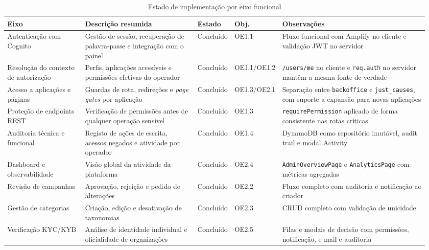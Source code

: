 \begin{table}[H]
\caption{Estado de implementação por eixo funcional}
\label{tab:avaliacao_rf}
\begin{center}
\begingroup
\scriptsize
\setlength{\tabcolsep}{4pt}
\begin{tabular}{|>{\raggedright\arraybackslash}p{2.3cm}|>{\raggedright\arraybackslash}p{3.2cm}|>{\raggedright\arraybackslash}p{1.2cm}|>{\raggedright\arraybackslash}p{1.8cm}|>{\raggedright\arraybackslash}p{3.7cm}|}
\hline
\textbf{Eixo} & \textbf{Descrição resumida} & \textbf{Estado} & \textbf{Obj.} & \textbf{Observações} \\ \hline
Autenticação com Cognito & Gestão de sessão, recuperação de palavra-passe e integração com o painel & Concluído & OE1.1 & Fluxo funcional com Amplify no cliente e validação JWT no servidor \\ \hline
Resolução do contexto de autorização & Perfis, aplicações acessíveis e permissões efetivas do operador & Concluído & OE1.1/OE1.2 & \texttt{/users/me} no cliente e \texttt{req.auth} no servidor mantêm a mesma fonte de verdade \\ \hline
Acesso a aplicações e páginas & Guardas de rota, redireções e \textit{page gates} por aplicação & Concluído & OE1.3/OE2.1 & Separação entre \texttt{backoffice} e \texttt{just\_causes}, com suporte a expansão para novas aplicações \\ \hline
Proteção de endpoints \gls{REST} & Verificação de permissões antes de qualquer operação sensível & Concluído & OE1.3 & \texttt{requirePermission} aplicado de forma consistente nas rotas críticas \\ \hline
Auditoria técnica e funcional & Registo de ações de escrita, acessos negados e atividade por operador & Concluído & OE1.4 & DynamoDB como repositório imutável, audit trail e modal Activity \\ \hline
Dashboard e observabilidade & Visão global da atividade da plataforma & Concluído & OE2.4 & \texttt{AdminOverviewPage} e \texttt{AnalyticsPage} com métricas agregadas \\ \hline
Revisão de campanhas & Aprovação, rejeição e pedido de alterações & Concluído & OE2.2 & Fluxo completo com auditoria e notificação ao criador \\ \hline
Gestão de categorias & Criação, edição e desativação de taxonomias & Concluído & OE2.3 & \gls{CRUD} completo com validação de unicidade \\ \hline
Verificação KYC/KYB & Análise de identidade individual e oficialidade de organizações & Concluído & OE2.5 & Filas e modais de decisão com permissões, notificação, e-mail e auditoria \\ \hline

\end{tabular}
\end{center}
\end{table}

